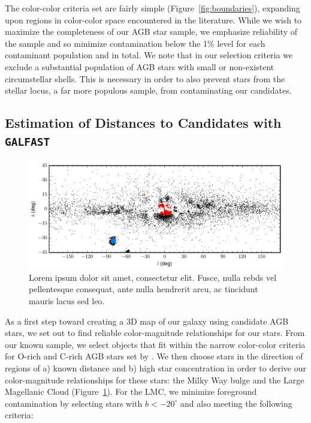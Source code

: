 The color-color criteria set are fairly simple (Figure~\ref{fig:boundaries}), expanding upon regions in color-color space encountered in the literature. While we wish to maximize the completeness of our AGB star sample, we emphasize reliability of the sample and so minimize contamination below the 1\% level for each contaminant population and in total. We note that in our selection criteria we exclude a substantial population of AGB stars with small or non-existent circumstellar shells. This is necessary in order to also prevent stars from the stellar locus, a far more populous sample, from contaminating our candidates.

\subsection{Estimation of Distances to Candidates with {\tt GALFAST}}
\begin{figure}[h]
\includegraphics[width=6in]{figs/bulge_lmc_galcoords.pdf}
\caption{Lorem ipsum dolor sit amet, consectetur elit. Fusce, nulla rebds vel pellentesque consequat, ante nulla hendrerit arcu, ac tincidunt mauris lacus sed leo.}
\label{fig:galplot}
\end{figure}

As a first step toward creating a 3D map of our galaxy using candidate AGB stars, we set out to find reliable color-magnitude relationships for our stars. From our known sample, we select objects that fit within the narrow color-color criteria for O-rich and C-rich AGB stars set by \cite{2014MNRAS.442.3361N}. We then choose stars in the direction of regions of a) known distance and b) high star concentration in order to derive our color-magnitude relationships for these stars: the Milky Way bulge and the Large Magellanic Cloud (Figure~\ref{fig:galplot}). For the LMC, we minimize foreground contamination by selecting stars with $b < -20^\circ$ and also meeting the following criteria:

